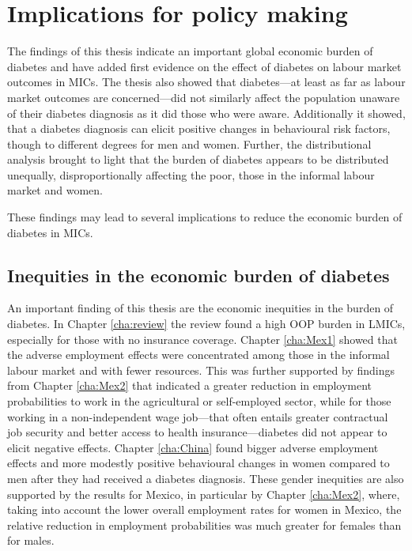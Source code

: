 \section{Implications for policy making}

The findings of this thesis indicate an important global economic burden of diabetes and have added first evidence on the effect of diabetes on labour market outcomes in \acp{MIC}. The thesis also showed that diabetes---at least as far as labour market outcomes are concerned---did not similarly affect the population unaware of their diabetes diagnosis as it did those who were aware. Additionally it showed, that a diabetes diagnosis can elicit positive changes in behavioural risk factors, though to different degrees for men and women. Further, the distributional analysis brought to light that the burden of diabetes appears to be distributed unequally, disproportionally affecting the poor, those in the informal labour market and women.

These findings may lead to several implications to reduce the economic burden of diabetes in \acp{MIC}. 

\subsection{Inequities in the economic burden of diabetes}

An important finding of this thesis are the economic inequities in the burden of diabetes. In Chapter \ref{cha:review} the review found a high \ac{OOP} burden in \acp{LMIC}, especially for those with no insurance coverage. Chapter \ref{cha:Mex1} showed that the adverse employment effects were concentrated among those in the informal labour market and with fewer resources. This was further supported by findings from Chapter \ref{cha:Mex2} that indicated a greater reduction in employment probabilities to work in the agricultural or self-employed sector, while for those working in a non-independent wage job---that often entails greater contractual job security and better access to health insurance---diabetes did not appear to elicit negative effects. Chapter \ref{cha:China} found bigger adverse employment effects and more modestly positive behavioural changes in women compared to men after they had received a diabetes diagnosis. These gender inequities are also supported by the results for Mexico, in particular by Chapter \ref{cha:Mex2}, where, taking into account the lower overall employment rates for women in Mexico, the relative reduction in employment probabilities was much greater for females than for males.


